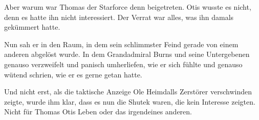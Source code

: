 Aber warum war Thomas der Starforce denn beigetreten. Otis wusste es nicht, denn es hatte ihn nicht interessiert. Der Verrat war alles, was ihn damals gekümmert hatte.

\par

Nun sah er in den Raum, in dem sein schlimmster Feind gerade von einem anderen abgelöst wurde. In dem Grandadmiral Burns und seine Untergebenen genauso verzweifelt und panisch umherliefen, wie er sich fühlte und genauso wütend schrien, wie er es gerne getan hatte.

\par

Und nicht erst, als die taktische Anzeige Ole Heimdalls Zerstörer verschwinden zeigte, wurde ihm klar, dass es nun die Shutek waren, die kein Interesse zeigten. Nicht für Thomas Otis Leben oder das irgendeines anderen.